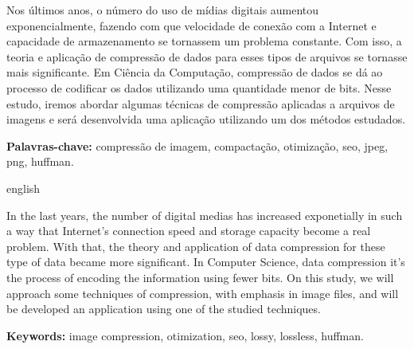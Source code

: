 \documentclass[
	12pt,				%
	openright,			%
	oneside,			%
	a4paper,			%
	english,			%
	french,				%
	spanish,			%
	brazil				%
	]{abntex2}
\begin{document}

\setlength{\absparsep}{18pt} %
\begin{resumo}

Nos últimos anos, o número do uso de mídias digitais aumentou exponencialmente, fazendo com que velocidade de conexão com a Internet e capacidade de armazenamento se tornassem um problema constante. Com isso, a teoria e aplicação de compressão de dados para esses tipos de arquivos se tornasse mais significante. Em Ciência da Computação, compressão de dados se dá ao processo de codificar os dados utilizando uma quantidade menor de bits. Nesse estudo, iremos abordar algumas técnicas de compressão aplicadas a arquivos de imagens e será desenvolvida uma aplicação utilizando um dos métodos estudados.

\textbf{Palavras-chave:} compressão de imagem, compactação, otimização, seo, jpeg, png, huffman.
\end{resumo}

\begin{resumo}[Abstract]
 \begin{otherlanguage*}{english}

In the last years, the number of digital medias has increased exponetially in such a way that Internet's connection speed and storage capacity become a real problem. With that, the theory and application of data compression for these type of data became more significant. In Computer Science, data compression it's the process of encoding the information using fewer bits. On this study, we will approach some techniques of compression, with emphasis in image files, and will be developed an application using one of the studied techniques.

\textbf{Keywords:} image compression, otimization, seo, lossy, lossless, huffman.

 \end{otherlanguage*}
\end{resumo}

\listoffigures*
\cleardoublepage

\listoftables*
\cleardoublepage


\tableofcontents*
\cleardoublepage
\end{document}
